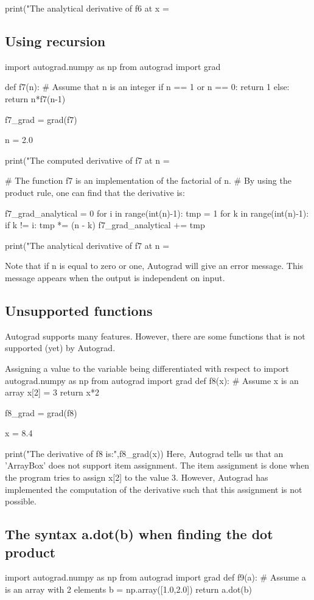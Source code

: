 \documentclass[%
oneside,                 %
final,                   %
10pt]{article}
\begin{document}
print("The analytical derivative of f6 at x = %
\epycod

\subsection{Using recursion}
\bpycod
import autograd.numpy as np
from autograd import grad

def f7(n): # Assume that n is an integer
    if n == 1 or n == 0:
        return 1
    else:
        return n*f7(n-1)

f7_grad = grad(f7)

n = 2.0

print("The computed derivative of f7 at n = %

# The function f7 is an implementation of the factorial of n.
# By using the product rule, one can find that the derivative is:

f7_grad_analytical = 0
for i in range(int(n)-1):
    tmp = 1
    for k in range(int(n)-1):
        if k != i:
            tmp *= (n - k)
    f7_grad_analytical += tmp

print("The analytical derivative of f7 at n = %

\epycod
Note that if n is equal to zero or one, Autograd will give an error message. This message appears when the output is independent on input.

\subsection{Unsupported functions}
Autograd supports many features. However, there are some functions that is not supported (yet) by Autograd.

Assigning a value to the variable being differentiated with respect to
\bpycod
import autograd.numpy as np
from autograd import grad
def f8(x): # Assume x is an array
    x[2] = 3
    return x*2

f8_grad = grad(f8)

x = 8.4

print("The derivative of f8 is:",f8_grad(x))
\epycod
Here, Autograd tells us that an 'ArrayBox' does not support item assignment. The item assignment is done when the program tries to assign x[2] to the value 3. However, Autograd has implemented the computation of the derivative such that this assignment is not possible.

\subsection{The syntax a.dot(b) when finding the dot product}
\bpycod
import autograd.numpy as np
from autograd import grad
def f9(a): # Assume a is an array with 2 elements
    b = np.array([1.0,2.0])
    return a.dot(b)
\end{document}
